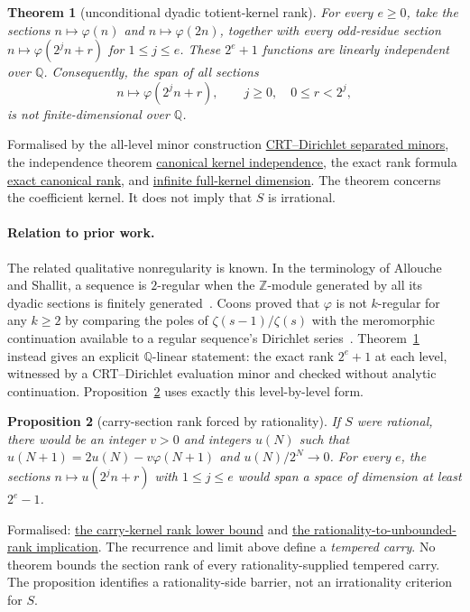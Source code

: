 \documentclass[11pt]{article}
\newcommand{\commit}{312b96c0d149ed466725c62d4ef24cfc91bca34e}
\newcommand{\repobase}{https://github.com/wcook04/plectis-lean-erdos249-257/blob/\commit}
\newcommand{\PK}{Erdos249257}
\newcommand{\lword}[4]{\href{\repobase/\PK/#1\#L#2}{#4}}
\newtheorem{theorem}{Theorem}[section]
\newtheorem{proposition}[theorem]{Proposition}
\theoremstyle{definition}
\theoremstyle{remark}
\newcommand{\Z}{\mathbb{Z}}
\newcommand{\Q}{\mathbb{Q}}
\newcommand{\ph}{\varphi}
\begin{document}
{\begin{theorem}[unconditional dyadic totient-kernel rank]
\label{res:dyadictotient}
For every $e\geq0$, take the sections $n\mapsto\ph(n)$ and
$n\mapsto\ph(2n)$, together with every odd-residue section
$n\mapsto\ph(2^jn+r)$ for $1\leq j\leq e$.  These $2^e+1$ functions are
linearly independent over $\Q$.
Consequently, the span of all sections
\[
 n\longmapsto \ph(2^j n+r),\qquad j\geq0,\quad 0\leq r<2^j,
\]
is not finite-dimensional over $\Q$.
\end{theorem}
\noindent Formalised by the all-level minor construction
\lword{TotientMahlerDefect.lean}{847}{exists_separatedMinorCertificate_totientAffineOddFamily}{CRT--Dirichlet separated minors},
the independence theorem
\lword{TotientMahlerDefect.lean}{900}{linearIndependent_canonicalTotientKernelFamily}{canonical kernel independence},
the exact rank formula
\lword{TotientMahlerDefect.lean}{954}{finrank_canonicalTotientKernel_eq}{exact canonical rank},
and
\lword{TotientMahlerDefect.lean}{1014}{not_finiteDimensional_span_fullTotientKernel}{infinite full-kernel dimension}.
The theorem concerns the coefficient kernel.  It does not imply that $S$ is
irrational.

\paragraph{Relation to prior work.}
The related qualitative nonregularity is known.  In the terminology of
Allouche and Shallit, a sequence is $2$-regular when the $\Z$-module generated
by all its dyadic sections is finitely generated~\cite[Chapter~16]{alloucheshallit}.
Coons proved that $\ph$ is not $k$-regular for any $k\geq2$ by comparing the
poles of $\zeta(s-1)/\zeta(s)$ with the meromorphic continuation available to
a regular sequence's Dirichlet series~\cite[Theorem~3.2]{coons2010}.
Theorem~\ref{res:dyadictotient} instead gives an explicit $\Q$-linear statement:
the exact rank $2^e+1$ at each level, witnessed by a CRT--Dirichlet evaluation
minor and checked without analytic continuation.
Proposition~\ref{res:carryrank} uses exactly this level-by-level form.

\begin{proposition}[carry-section rank forced by rationality]\label{res:carryrank}
If $S$ were rational, there would be an integer $v>0$ and integers $u(N)$ such
that $u(N+1)=2u(N)-v\ph(N+1)$ and $u(N)/2^N\to0$.  For every $e$, the
sections $n\mapsto u(2^jn+r)$ with
$1\leq j\leq e$ would span a space of dimension at least $2^e-1$.
\end{proposition}
\noindent Formalised:
\lword{TotientCarryKernelRigidity.lean}{211}{finrank_canonicalCarryKernel_ge_of_linearIndependent}{the carry-kernel rank lower bound}
and
\lword{TotientCarryKernelRigidity.lean}{284}{not_irrational_totientSeries_implies_unbounded_carryRank_unconditional}{the rationality-to-unbounded-rank implication}.
The recurrence and limit above define a \emph{tempered carry}.  No theorem
bounds the section rank of every rationality-supplied tempered carry.  The
proposition identifies a rationality-side barrier, not an irrationality
criterion for $S$.

}
\end{document}
